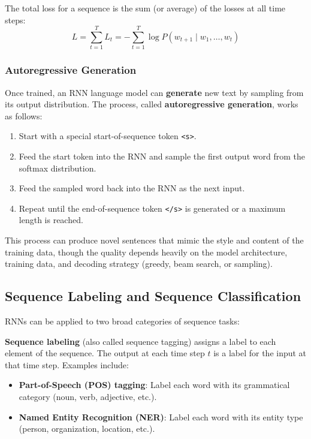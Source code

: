 \documentclass[11pt,a4paper]{article}
\begin{document}
The total loss for a sequence is the sum (or average) of the losses at all time steps:
\[
L = \sum_{t=1}^{T} L_t = -\sum_{t=1}^{T} \log P(w_{t+1} \mid w_1, \ldots, w_t)
\]

\subsubsection{Autoregressive Generation}

Once trained, an RNN language model can \textbf{generate} new text by sampling from its output distribution. The process, called \textbf{autoregressive generation}, works as follows:
\begin{enumerate}
    \item Start with a special start-of-sequence token \texttt{<s>}.
    \item Feed the start token into the RNN and sample the first output word from the softmax distribution.
    \item Feed the sampled word back into the RNN as the next input.
    \item Repeat until the end-of-sequence token \texttt{</s>} is generated or a maximum length is reached.
\end{enumerate}

This process can produce novel sentences that mimic the style and content of the training data, though the quality depends heavily on the model architecture, training data, and decoding strategy (greedy, beam search, or sampling).

\subsection{Sequence Labeling and Sequence Classification}

RNNs can be applied to two broad categories of sequence tasks:

\textbf{Sequence labeling} (also called sequence tagging) assigns a label to each element of the sequence. The output at each time step $t$ is a label for the input at that time step. Examples include:
\begin{itemize}
    \item \textbf{Part-of-Speech (POS) tagging}: Label each word with its grammatical category (noun, verb, adjective, etc.).
    \item \textbf{Named Entity Recognition (NER)}: Label each word with its entity type (person, organization, location, etc.).
\end{itemize}
\end{document}
